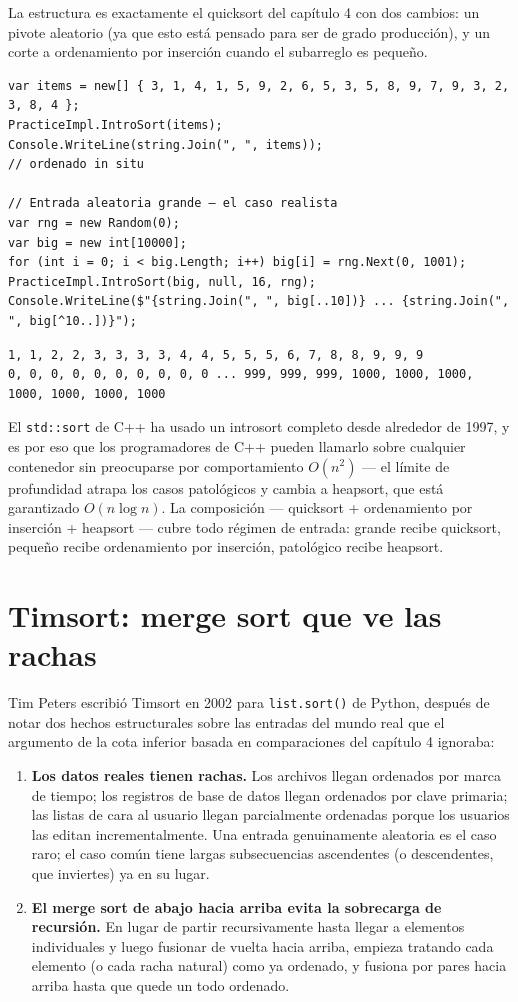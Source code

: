 \documentclass[11pt,a4paper]{article}
\begin{document}
La estructura es exactamente el quicksort del capítulo 4 con dos cambios: un pivote aleatorio (ya que esto está pensado para ser de grado producción), y un corte a ordenamiento por inserción cuando el subarreglo es pequeño.

\begin{lstlisting}
var items = new[] { 3, 1, 4, 1, 5, 9, 2, 6, 5, 3, 5, 8, 9, 7, 9, 3, 2, 3, 8, 4 };
PracticeImpl.IntroSort(items);
Console.WriteLine(string.Join(", ", items));
// ordenado in situ

// Entrada aleatoria grande — el caso realista
var rng = new Random(0);
var big = new int[10000];
for (int i = 0; i < big.Length; i++) big[i] = rng.Next(0, 1001);
PracticeImpl.IntroSort(big, null, 16, rng);
Console.WriteLine($"{string.Join(", ", big[..10])} ... {string.Join(", ", big[^10..])}");
\end{lstlisting}

\begin{verbatim}
1, 1, 2, 2, 3, 3, 3, 3, 4, 4, 5, 5, 5, 6, 7, 8, 8, 9, 9, 9
0, 0, 0, 0, 0, 0, 0, 0, 0, 0 ... 999, 999, 999, 1000, 1000, 1000, 1000, 1000, 1000, 1000
\end{verbatim}

El \texttt{std::sort} de C++ ha usado un introsort completo desde alrededor de 1997, y es por eso que los programadores de C++ pueden llamarlo sobre cualquier contenedor sin preocuparse por comportamiento $O(n^2)$ --- el límite de profundidad atrapa los casos patológicos y cambia a heapsort, que está garantizado $O(n \log n)$. La composición --- quicksort + ordenamiento por inserción + heapsort --- cubre todo régimen de entrada: grande recibe quicksort, pequeño recibe ordenamiento por inserción, patológico recibe heapsort.

\section{Timsort: merge sort que ve las rachas}

Tim Peters escribió Timsort en 2002 para \texttt{list.sort()} de Python, después de notar dos hechos estructurales sobre las entradas del mundo real que el argumento de la cota inferior basada en comparaciones del capítulo 4 ignoraba:

\begin{enumerate}
\item \textbf{Los datos reales tienen rachas.} Los archivos llegan ordenados por marca de tiempo; los registros de base de datos llegan ordenados por clave primaria; las listas de cara al usuario llegan parcialmente ordenadas porque los usuarios las editan incrementalmente. Una entrada genuinamente aleatoria es el caso raro; el caso común tiene largas subsecuencias ascendentes (o descendentes, que inviertes) ya en su lugar.
\item \textbf{El merge sort de abajo hacia arriba evita la sobrecarga de recursión.} En lugar de partir recursivamente hasta llegar a elementos individuales y luego fusionar de vuelta hacia arriba, empieza tratando cada elemento (o cada racha natural) como ya ordenado, y fusiona por pares hacia arriba hasta que quede un todo ordenado.
\end{enumerate}
\end{document}
